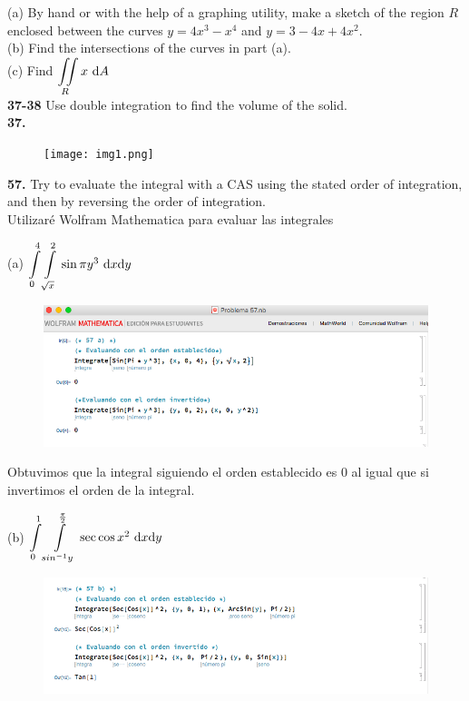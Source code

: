 \documentclass[11pt]{report}
\begin{document}
(a) By hand or with the help of a graphing utility, make a sketch of the region
$R$ enclosed between the curves $y = 4x^3 - x^4$ and $y = 3 - 4x + 4x^2$. \\

(b) Find the intersections of the curves in part (a). \\

(c) Find $ {\displaystyle \iint \limits_R } \, x \, \, \text dA $ \\

\textbf{37-38} Use double integration to find the volume of the solid. \\

\textbf{37.} \\

\begin{figure}[h]
\texttt{[image: img1.png]}
\centering
\end{figure}

\textbf{57.} Try to evaluate the integral with a CAS using the stated order of
integration, and then by reversing the order of integration.\\

Utilizar\'{e} Wolfram Mathematica para evaluar las integrales

(a) $ {\displaystyle \int \limits_0^4 \int \limits_{\sqrt{x}}^2 } \, \sin{\pi y^3} \, \, \text dx \text dy $ \\
\begin{figure}[h]
\includegraphics[scale=0.5]{img4.png}
\centering
\end{figure}

Obtuvimos que la integral siguiendo el orden establecido
es $0$ al igual que si invertimos el orden de la integral.

(b) $ {\displaystyle \int \limits_0^1 \int \limits_{sin^{-1}y}^{\frac{\pi}{2}} } \, \sec{\cos{x}}^2 \, \, \text dx \text dy $ \\
\begin{figure}[h]
\includegraphics[scale=0.5]{img3.png}
\centering
\end{figure}
\end{document}
